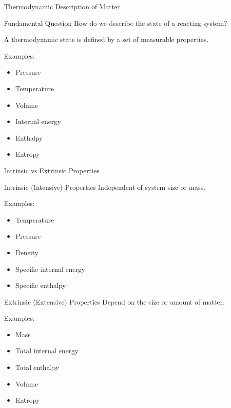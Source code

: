 \documentclass[aspectratio=169]{beamer}
\begin{document}
\begin{frame}{Thermodynamic Description of Matter}
\begin{block}{Fundamental Question}
How do we describe the state of a reacting system?
\end{block}

\vspace{0.3cm}

A thermodynamic state is defined by a set of measurable properties.

\vspace{0.3cm}

Examples:
\begin{itemize}
  \item Pressure
  \item Temperature
  \item Volume
  \item Internal energy
  \item Enthalpy
  \item Entropy
\end{itemize}
\end{frame}

\begin{frame}{Intrinsic vs Extrinsic Properties}

\begin{block}{Intrinsic (Intensive) Properties}
Independent of system size or mass.
\end{block}

Examples:
\begin{itemize}
  \item Temperature
  \item Pressure
  \item Density
  \item Specific internal energy
  \item Specific enthalpy
\end{itemize}

\pause

\begin{block}{Extrinsic (Extensive) Properties}
Depend on the size or amount of matter.
\end{block}

Examples:
\begin{itemize}
  \item Mass
  \item Total internal energy
  \item Total enthalpy
  \item Volume
  \item Entropy
\end{itemize}

\end{frame}
\end{document}
